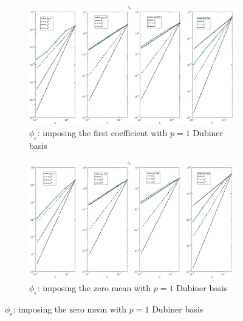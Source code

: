 \documentclass[a4paper,11pt]{article}
\begin{document}
\begin{figure}[H]
\caption{Comparison of the extracellular potential ($\phi_e$)}
\label{phie-unique}
\begin{subfigure}{\textwidth}
\begin{center}
\includegraphics[width = \textwidth]{./errors/D1_Phie_1.jpg}
\caption{$\phi_e$: imposing the first coefficient with $p=1$ Dubiner basis}
\end{center}
\end{subfigure}
\begin{subfigure}{\textwidth}
\begin{center}
\includegraphics[width =\textwidth]{./errors/D1_Phie_2.jpg}
\caption{$\phi_e$: imposing the zero mean with $p=1$ Dubiner basis}
\end{center}
\end{subfigure}
\end{figure}
\newpage
\end{document}
